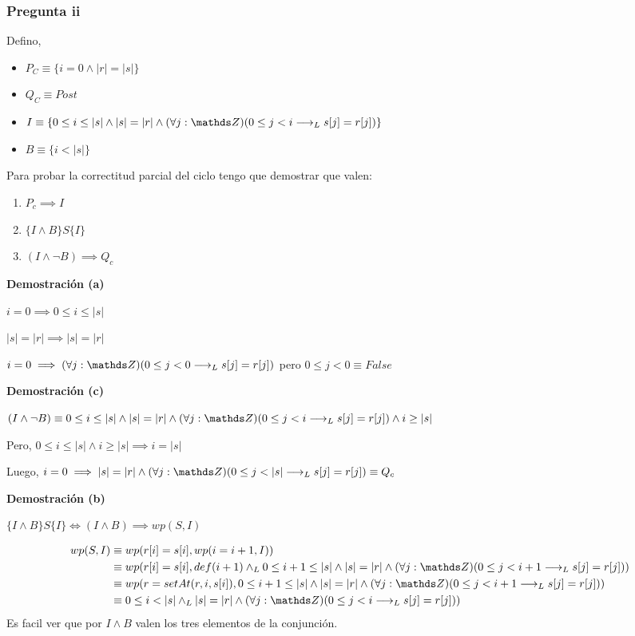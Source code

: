 \subsubsection{Pregunta ii}

Defino,
\begin{itemize}
    \item $ P_C \equiv \{ i = 0 \wedge |r| = |s| \} $
    \item $ Q_C \equiv Post $
    \item $ I \equiv \{ 0 \leq i \leq |s| \wedge |s| = |r| \wedge (\forall j: \ent)(0 \leq j < i \implicaLuego s[j] = r[j]) \} $
    \item $ B \equiv \{ i < |s| \} $
\end{itemize}

Para probar la correctitud parcial del ciclo tengo que demostrar que valen:
\begin{enumerate}[label=(\alph*)]
    \item $ P_c \implies I $
    \item $ \{ I \wedge B \} S \{ I \} $
    \item $ (I \wedge \neg B) \implies Q_c $
\end{enumerate}

\textbf{Demostración (a)}

$ i = 0 \implies 0 \leq i \leq |s| $

$ |s| = |r| \implies |s| = |r| $

$ i = 0 \implies (\forall j: \ent)(0 \leq j < 0 \implicaLuego s[j] = r[j]) $ pero $ 0 \leq j < 0 \equiv False $

\textbf{Demostración (c)}

$ (I \wedge \neg B) \equiv 0 \leq i \leq |s| \wedge |s| = |r| \wedge (\forall j: \ent)(0 \leq j < i \implicaLuego s[j] = r[j]) \wedge i \geq |s| $

Pero, $ 0 \leq i \leq |s| \wedge i \geq |s| \implies i = |s| $

Luego, $ i = 0 \implies |s| = |r| \wedge (\forall j: \ent)(0 \leq j < |s| \implicaLuego s[j] = r[j]) \equiv Q_c $

\textbf{Demostración (b)}

$ \{ I \wedge B \} S \{ I \} \iff (I \wedge B) \implies wp(S,I) $

\begin{align*}
    wp(S,I) &\equiv wp(r[i] = s[i], wp(i=i+1, I)) \\
    &\equiv wp(r[i] = s[i], def(i+1) \yLuego 0 \leq i+1 \leq |s| \wedge |s| = |r| \wedge (\forall j: \ent)(0 \leq j < i+1 \implicaLuego s[j] = r[j])) \\
    &\equiv wp(r = setAt(r,i,s[i]), 0 \leq i+1 \leq |s| \wedge |s| = |r| \wedge (\forall j: \ent)(0 \leq j < i+1 \implicaLuego s[j] = r[j])) \\
    &\equiv 0 \leq i < |s| \yLuego |s| = |r| \wedge (\forall j: \ent)(0 \leq j < i \implicaLuego s[j] = r[j])) \\
\end{align*}
Es facil ver que por $ I\wedge B $ valen los tres elementos de la conjunción.

